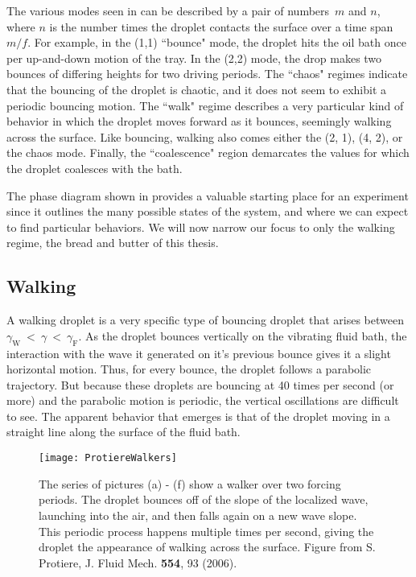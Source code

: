 The various modes seen in  can be described by a pair of numbers~$m$ and $n$, where $n$ is the number times the droplet contacts the surface over a time span $m/f$. For example, in the (1,1) ``bounce" mode, the droplet hits the oil bath once per up-and-down motion of the tray. In the (2,2) mode, the drop makes two bounces of differing heights for two driving periods. The ``chaos" regimes indicate that the bouncing of the droplet is chaotic, and it does not seem to exhibit a periodic bouncing motion. The ``walk" regime describes a very particular kind of behavior in which the droplet moves forward as it bounces, seemingly walking across the surface. Like bouncing, walking also comes either the (2, 1), (4, 2), or the chaos mode. Finally, the ``coalescence" region demarcates the values for which the droplet coalesces with the bath.

The phase diagram shown in  provides a valuable starting place for an experiment since it outlines the many possible states of the system, and where we can expect to find particular behaviors. We will now narrow our focus to only the walking regime, the bread and butter of this thesis.

	        \subsection{Walking}
	        \label{sect:walking}
A walking droplet is a very specific type of bouncing droplet that arises between $\gamma_\mathrm{W}~<~\gamma~<~\gamma_\mathrm{F}$. As the droplet bounces vertically on the vibrating fluid bath, the interaction with the wave it generated on it's previous bounce gives it a slight horizontal motion. Thus, for every bounce, the droplet follows a parabolic trajectory. But because these droplets are bouncing at 40 times per second (or more) and the parabolic motion is periodic, the vertical oscillations are difficult to see. The apparent behavior that emerges is that of the droplet moving in a straight line along the surface of the fluid bath.             

 \begin{figure}[h]
	       \centering
	    \texttt{[image: ProtiereWalkers]}
	     \caption{%
	    The series of pictures (a) - (f) show a walker over two forcing periods. The droplet bounces off of the slope of the localized wave, launching into the air, and then falls again on a new wave slope. This periodic process happens multiple times per second, giving the droplet the appearance of walking across the surface. Figure from S. Protiere, J. Fluid Mech. \textbf{554}, 93 (2006).
	     }
	 \label{Couderwalkers}
	\end{figure}
 
